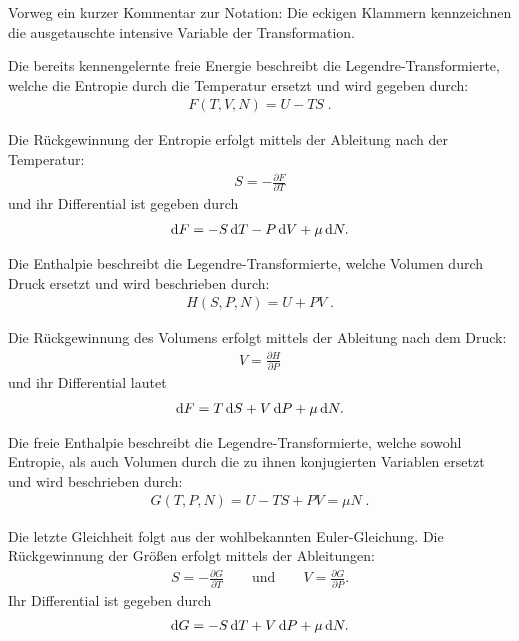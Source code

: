 Vorweg ein kurzer Kommentar zur Notation: Die eckigen Klammern kennzeichnen die ausgetauschte intensive Variable der Transformation. 
\begin{formal}

    Die bereits kennengelernte freie Energie beschreibt die Legendre-Transformierte, welche die Entropie durch die Temperatur ersetzt und wird gegeben durch:
    \begin{align*}
        \boxed{F(T,V,N)=U-TS}\;.
    \end{align*}
\end{formal}
Die Rückgewinnung der Entropie erfolgt mittels der Ableitung nach der Temperatur:
    \begin{align*}
        S=-\frac{\partial F}{\partial T}
    \end{align*}
    und ihr Differential ist gegeben durch 
    \begin{align*}
        \mathop{}\!\mathrm{d} F=-S\mathop{}\!\mathrm{d} T-P\mathop{}\!\mathrm{d} V+\mu \mathop{}\!\mathrm{d} N.
    \end{align*}
\begin{formal}

    Die Enthalpie beschreibt die Legendre-Transformierte, welche Volumen durch Druck ersetzt und wird beschrieben durch:
    \begin{align*}
        \boxed{H(S,P,N)=U+PV}\;.
    \end{align*}
\end{formal}
Die Rückgewinnung des Volumens erfolgt mittels der Ableitung nach dem Druck:
    \begin{align*}
        V=\frac{\partial H}{\partial P}
    \end{align*}
    und ihr Differential lautet
    \begin{align*}
        \mathop{}\!\mathrm{d} F=T\mathop{}\!\mathrm{d} S+V\mathop{}\!\mathrm{d} P+\mu \mathop{}\!\mathrm{d} N.
    \end{align*}
\begin{formal}

    Die freie Enthalpie beschreibt die Legendre-Transformierte, welche sowohl Entropie, als auch Volumen durch die zu ihnen konjugierten Variablen ersetzt und wird beschrieben durch:
    \begin{align*}
        \boxed{G(T,P,N)=U-TS+PV=\mu N}\;.
    \end{align*}
\end{formal}
Die letzte Gleichheit folgt aus der wohlbekannten Euler-Gleichung. Die Rückgewinnung der Größen erfolgt mittels der Ableitungen:
    \begin{align*}
        S=-\frac{\partial G}{\partial T}\qquad \mathrm{und}\qquad V=\frac{\partial G}{\partial P}.
    \end{align*}
    Ihr Differential ist gegeben durch 
    \begin{align*}
        \mathop{}\!\mathrm{d} G=-S\mathop{}\!\mathrm{d} T+V\mathop{}\!\mathrm{d} P+\mu \mathop{}\!\mathrm{d} N.
    \end{align*}

